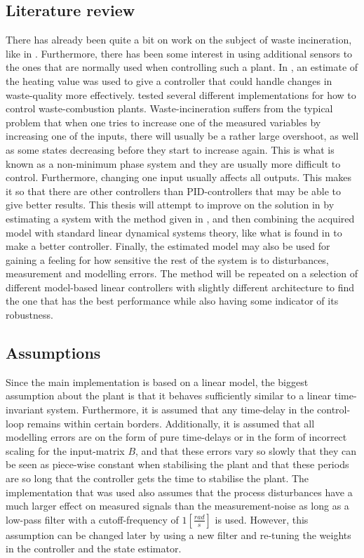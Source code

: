 \subsection{Literature review}
There has already been quite a bit on work on the subject of waste incineration, like in \cite{waste_prof}. Furthermore, there has been some interest in using additional sensors to the ones that are normally used when controlling such a plant. In \cite{summer_student}, an estimate of the heating value was used to give a controller that could handle changes in waste-quality more effectively. \cite{waste_prof} tested several different implementations for how to control waste-combustion plants. Waste-incineration suffers from the typical problem that when one tries to increase one of the measured variables by increasing one of the inputs, there will usually be a rather large overshoot, as well as some states decreasing before they start to increase again. This is what is known as a non-minimum phase system and they are usually more difficult to control. Furthermore, changing one input usually affects all outputs. This makes it so that there are other controllers than PID-controllers that may be able to give better results. This thesis will attempt to improve on the solution in \cite{summer_student} by estimating a system with the method given in \cite{ERA_source}, and then combining the acquired model with standard linear dynamical systems theory, like what is found in \cite{cont_LQR_lecture} to make a better controller. Finally, the estimated model may also be used for gaining a feeling for how sensitive the rest of the system is to disturbances, measurement  and modelling errors. The method will be repeated on a selection of different model-based linear controllers with slightly different architecture  to find the one that has the best performance while also having some indicator of its robustness. 

\subsection{Assumptions}
Since the main implementation is based on a linear model, the biggest assumption about the plant is that it behaves sufficiently similar to a linear time-invariant system. Furthermore, it is assumed that any time-delay in the control-loop remains within certain borders. Additionally, it is assumed that all modelling errors are on the form of pure time-delays or in the form of incorrect scaling for the input-matrix $B$, and that these errors vary so slowly that they can be seen as piece-wise constant when stabilising the plant and that these periods are so long that the controller gets the time to stabilise the plant. The implementation that was used also assumes that the process disturbances have a much larger effect on measured signals than the measurement-noise as long as a low-pass filter with a cutoff-frequency of $1 \left[\frac{rad}{s}\right]$ is used. However, this assumption can be changed later by using a new filter and re-tuning the weights in the controller and the state estimator. 
